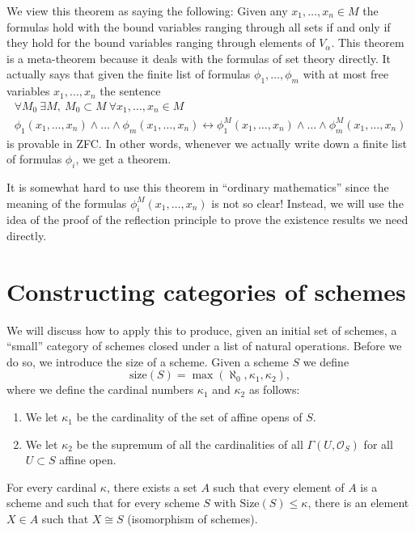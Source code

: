 \noindent
We view this theorem as saying the following: Given any
$x_1, \ldots, x_n \in M$ the formulas hold with the bound variables ranging
through all sets if and only if they hold for the bound variables ranging
through elements of $V_\alpha$. This theorem is a meta-theorem because
it deals with the formulas of set theory directly.
It actually says that given the finite list of formulas
$\phi_1, \ldots, \phi_m$ with at most free variables $x_1, \ldots, x_n$
the sentence
$$
\begin{matrix}
\forall M_0\ \exists M, \ M_0 \subset M\ \forall x_1, \ldots, x_n \in M \\
\phi_1(x_1, \ldots, x_n) \wedge \ldots \wedge \phi_m(x_1, \ldots, x_n)
\leftrightarrow
\phi_1^M(x_1, \ldots, x_n) \wedge \ldots \wedge \phi_m^M(x_1, \ldots, x_n)
\end{matrix}
$$
is provable in ZFC. In other words, whenever we actually write down
a finite list of formulas $\phi_i$, we get a theorem.

\medskip\noindent
It is somewhat hard to use this theorem in ``ordinary mathematics''
since the meaning of the formulas $\phi_i^M(x_1, \ldots, x_n)$
is not so clear! Instead, we will use the idea of the proof of the
reflection principle to prove the existence results we need directly.

\section{Constructing categories of schemes}
\label{section-categories-schemes}

\noindent
We will discuss how to apply this to produce, given an initial
set of schemes, a ``small'' category of schemes closed under
a list of natural operations. Before we do so, we introduce the
size of a scheme. Given a scheme $S$ we define
$$
\text{size}(S) = \max(\aleph_0, \kappa_1, \kappa_2),
$$
where we define the cardinal numbers $\kappa_1$ and $\kappa_2$ as follows:
\begin{enumerate}
\item We let $\kappa_1$ be the cardinality of the set of affine opens of $S$.
\item We let $\kappa_2$ be the supremum of all the cardinalities of
all $\Gamma(U, \mathcal{O}_S)$ for all $U \subset S$ affine open.
\end{enumerate}

\begin{lemma}
\label{lemma-bounded-size}
For every cardinal $\kappa$, there exists a set $A$ such
that every element of $A$ is a scheme and such that for every
scheme $S$ with $\text{Size}(S) \leq \kappa$, there is
an element $X \in A$ such that $X \cong S$ (isomorphism
of schemes).
\end{lemma}

